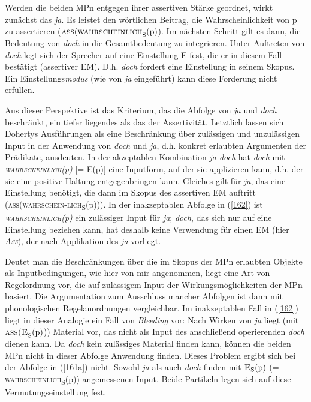 Werden die beiden MPn entgegen ihrer assertiven Stärke geordnet, wirkt zu\-nächst das \textit{ja}. Es leistet den wörtlichen Beitrag, die Wahrscheinlichkeit von p zu assertieren ($\textrm{\textsc{ass}(\textsc{wahrscheinlich}}_{\textrm{S}}(\textrm{p})$). Im nächsten Schritt gilt es dann, die Bedeutung von \textit{doch} in die Gesamtbedeutung zu integrieren. Unter Auftreten von \textit{doch} legt sich der Sprecher auf eine Einstellung E fest, die er in diesem Fall bestätigt (assertiver EM). D.h. \textit{doch} fordert eine Einstellung in seinem Skopus. Ein Einstellungs\emph{modus} (wie von \textit{ja} eingeführt) kann diese Forderung nicht erfüllen. 

Aus dieser Perspektive ist das Kriterium, das die Abfolge von \textit{ja} und \textit{doch} beschränkt, ein tiefer liegendes als das der Assertivität. Letztlich lassen sich Dohertys Ausführungen als eine Beschränkung über zulässigen und unzulässigen Input in der Anwendung von \textit{doch} und \textit{ja}, d.h. konkret erlaubten Argumenten der Prädikate, ausdeuten. In der akzeptablen Kombination \textit{ja doch} hat \textit{doch} mit \textit{\textsc{wahrscheinlich}(p)} [= E(p)] eine Inputform, auf der sie applizieren kann, d.h. der sie eine positive Haltung entgegenbringen kann. Gleiches gilt für \textit{ja}, das eine Einstellung benötigt, die dann im Skopus des assertiven EM auftritt (\textsc{ass}(\textsc{wahrschein-\linebreak lich}\textsubscript{S}(p))). In der inakzeptablen Abfolge in (\ref{162}) ist \textit{\textsc{wahrscheinlich}(p)} ein zulässiger Input für \textit{ja}; \textit{doch}, das sich nur auf eine Einstellung beziehen kann, hat deshalb keine Verwendung für einen EM (hier \textit{\textsc{Ass}}), der nach Applikation des \textit{ja} vorliegt.

Deutet man die Beschränkungen über die im Skopus der MPn erlaubten Objekte als Inputbedingungen, wie hier von mir angenommen, liegt eine Art von Regelordnung vor, die auf zulässigem Input der Wirkungsmöglichkeiten der MPn basiert. Die Argumentation zum Ausschluss mancher Abfolgen ist dann mit phonologischen Regelanordnungen vergleichbar. Im inakzeptablen Fall in (\ref{162}) liegt in dieser Analogie ein Fall von \textit{Bleeding} vor: Nach Wirken von \textit{ja} liegt (mit $\textrm{\textsc{ass(E}}_{\textrm{S}}(\textrm{p})$)) Material vor, das nicht als Input des anschließend operierenden \textit{doch} dienen kann. Da \textit{doch} kein zulässiges Material finden kann, können die beiden MPn nicht in dieser Abfolge Anwendung finden. Dieses Problem ergibt sich bei der Abfolge in (\ref{161a}) nicht. Sowohl \textit{ja} als auch \textit{doch} finden mit $\textrm{\textsc{E}}_{\textrm{S}}(\textrm{p})$ (= \textsc{wahrscheinlich}\textsubscript{S}(p)) angemessenen Input. Beide Partikeln legen sich auf diese Vermutungseinstellung fest.

